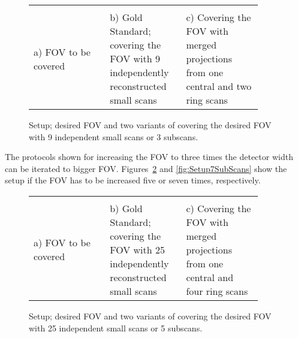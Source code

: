 \ifiucr
	\begin{figure}%
		\centering%
		\caption{Setup; desired FOV and two variants of covering the desired FOV with 9 independent small scans or 3 subscans.}%
		\begin{tabular}{p{0.3\linewidth}p{0.3\linewidth}p{0.3\linewidth}}
				 &%
			 &%
			\\%
			a) FOV to be covered &%
			b) Gold Standard; covering the FOV with 9 independently reconstructed small scans&%
			c) Covering the FOV with merged projections from one central and two ring scans\\%
		\end{tabular}%
		\label{fig:Setup3SubScans}%
	\end{figure}%
\else
	\begin{figure*}[htp]
		\centering%
		\caption{Setup; desired FOV and two variants of covering the desired FOV with 9 independent small scans or 3 subscans.}%
		\label{fig:Setup3SubScans}%
	\end{figure*}
\fi

The protocols shown for increasing the FOV to three times the detector width can be iterated to bigger FOV. Figures~\ref{fig:Setup5SubScans} and \ref{fig:Setup7SubScans} show the setup if the FOV has to be increased five or seven times, respectively.

\ifiucr
	\begin{figure}%
		\centering%
		\caption{Setup; desired FOV and two variants of covering the desired FOV with 25 independent small scans or 5 subscans.}%
		\begin{tabular}{p{0.3\linewidth}p{0.3\linewidth}p{0.3\linewidth}}%
			 &%
			 &%
			\\%
			a) FOV to be covered &%
			b) Gold Standard; covering the FOV with 25 independently reconstructed small scans &%
			c) Covering the FOV with merged projections from one central and four ring scans \\%
		\end{tabular}%
		\label{fig:Setup5SubScans}%
	\end{figure}%
\else
	\begin{figure*}[htp]
		\centering%
		\caption{Setup; desired FOV and two variants of covering the desired FOV with 25 independent small scans or 5 subscans.}%
		\label{fig:Setup5SubScans}%
	\end{figure*}
\fi

